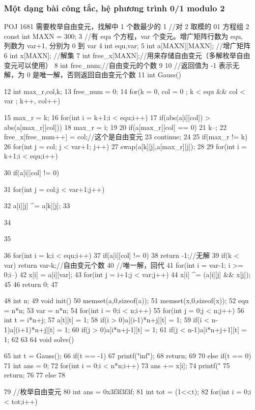\documentclass[11pt]{article}
\begin{document}
\subsubsection{Một dạng bài công tắc, hệ phương trình 0/1 modulo 2}

\begin{Code}
    POJ 1681 需要枚举自由变元，找解中 1 个数最少的
 1 //对 2 取模的 01 方程组
 2 const int MAXN = 300;
 3 //有 equ 个方程，var 个变元。增广矩阵行数为 equ, 列数为 var+1, 分别为 0 到
      var
 4 int equ,var;
 5 int a[MAXN][MAXN]; //增广矩阵
 6 int x[MAXN]; //解集
 7 int free_x[MAXN];//用来存储自由变元（多解枚举自由变元可以使用）
 8 int free_num;//自由变元的个数
 9
10 //返回值为 -1 表示无解，为 0 是唯一解，否则返回自由变元个数
11 int Gauss(){
12     int max_r,col,k;
13     free_num = 0;
14     for(k = 0, col = 0 ; k < equ && col < var ; k++, col++){
15         max_r = k;
16         for(int i = k+1;i < equ;i++){
17              if(abs(a[i][col]) > abs(a[max_r][col]))
18                  max_r = i;
19         }
20         if(a[max_r][col] == 0){
21              k--;
22              free_x[free_num++] = col;//这个是自由变元
23              continue;
24         }
25         if(max_r != k){
26              for(int j = col; j < var+1; j++)
27                  swap(a[k][j],a[max_r][j]);
28         }
29         for(int i = k+1;i < equ;i++){
30              if(a[i][col] != 0){
31                  for(int j = col;j < var+1;j++)


32                       a[i][j] ^= a[k][j];
33                  }
34              }
35       }
36       for(int i = k;i < equ;i++)
37           if(a[i][col] != 0)
38               return -1;//无解
39       if(k < var) return var-k;//自由变元个数
40       //唯一解，回代
41       for(int i = var-1; i >= 0;i--){
42           x[i] = a[i][var];
43           for(int j = i+1;j < var;j++)
44               x[i] ^= (a[i][j] && x[j]);
45       }
46       return 0;
47   }
48   int n;
49   void init(){
50       memset(a,0,sizeof(a));
51       memset(x,0,sizeof(x));
52       equ = n*n;
53       var = n*n;
54       for(int i = 0;i < n;i++)
55           for(int j = 0;j < n;j++){
56               int t = i*n+j;
57               a[t][t] = 1;
58               if(i > 0)a[(i-1)*n+j][t] = 1;
59               if(i < n-1)a[(i+1)*n+j][t] = 1;
60               if(j > 0)a[i*n+j-1][t] = 1;
61               if(j < n-1)a[i*n+j+1][t] = 1;
62           }
63   }
64   void solve(){
65       int t = Gauss();
66       if(t == -1){
67           printf("inf\n");
68           return;
69       }
70       else if(t == 0){
71           int ans = 0;
72           for(int i = 0;i < n*n;i++)
73               ans += x[i];
74           printf("%
75           return;
76       }
77       else
78       {
79           //枚举自由变元
80           int ans = 0x3f3f3f3f;
81           int tot = (1<<t);
82           for(int i = 0;i < tot;i++){


}}}
\end{Code}
\end{document}

